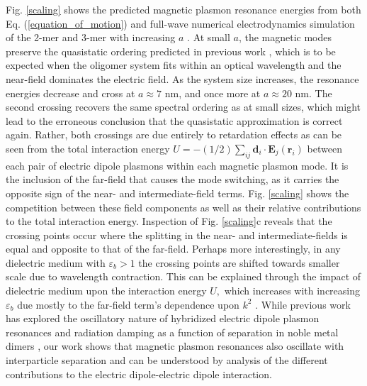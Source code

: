 \documentclass [11pt, proquest] {uwthesis}[2016/11/22]
\begin{document}
Fig. \ref{scaling} shows the predicted magnetic plasmon resonance energies from both Eq. (\ref{equation_of_motion}) and full-wave numerical electrodynamics simulation of the 2-mer and 3-mer with increasing $a$ \cite{Hohenester2012}. At small $a$, the magnetic modes preserve the quasistatic ordering predicted in previous work \cite{Cherqui2014}, which is to be expected when the oligomer system fits within an optical wavelength and the near-field dominates the electric field. As the system size increases, the resonance energies decrease and cross at $a \approx 7$ nm, and once more at $a \approx 20$ nm. The second crossing recovers the same spectral ordering as at small sizes, which might lead to the erroneous conclusion that the quasistatic approximation is correct again. Rather, both crossings are due entirely to retardation effects as can be seen from the total interaction energy $U = -({1}/{2}) \sum_{ij} \textbf{d}_i \cdot \textbf{E}_j(\textbf{r}_i)$ between each pair of electric dipole plasmons within each magnetic plasmon mode. It is the inclusion of the far-field that causes the mode switching, as it carries the opposite sign of the near- and intermediate-field terms. Fig. \ref{scaling} shows the competition between these field components as well as their relative contributions to the total interaction energy. Inspection of Fig. \ref{scaling}c reveals that the crossing points occur where the splitting in the near- and intermediate-fields is equal and opposite to that of the far-field. Perhaps more interestingly, in any dielectric medium with $\varepsilon_b > 1$ the crossing points are shifted towards smaller scale due to wavelength contraction. This can be explained through the impact of dielectric medium upon the interaction energy $U,$ which increases with increasing $\varepsilon_b$ due mostly to the far-field term's dependence upon $k^2$ \cite{Elsayed2008}. While previous work has explored the oscillatory nature of hybridized electric dipole plasmon resonances and radiation damping as a function of separation in noble metal dimers \cite{vonPlessen2007}, our work shows that magnetic plasmon resonances also oscillate with interparticle separation and can be understood by analysis of the different contributions to the electric dipole-electric dipole interaction.
\end{document}
